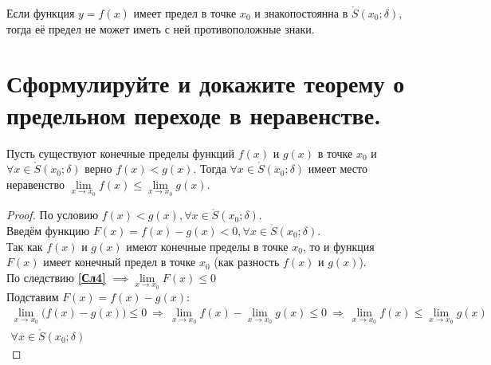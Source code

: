 \begin{corollary} 
  Если функция $y = f(x)$ имеет предел в точке  $x_0$ и знакопостоянна в $\mathring{S}(x_0; \delta)$, тогда её предел не может иметь с ней противоположные знаки.
\end{corollary} 

\section{Сформулируйте и докажите теорему о предельном переходе в неравенстве.}

\begin{theorem}
  Пусть существуют конечные пределы функций $f(x)$ и  $g(x)$ в точке $x_0$ и $\forall x \in \mathring{S}(x_0; \delta)$ верно $f(x) < g(x)$. Тогда $\forall x \in \mathring{S}(x_0; \delta)$ имеет место неравенство $\lim\limits_{x \to x_0} f(x) \le \lim\limits_{x \to x_0} g(x)$.
\end{theorem}
\begin{proof}
  По условию $f(x) < g(x), \forall x \in \mathring{S}(x_0; \delta)$. \\
  Введём функцию $F(x) = f(x) - g(x) < 0, \forall x \in \mathring{S}(x_0; \delta)$. \\
  Так как $f(x)$ и $g(x)$ имеют конечные пределы в точке $x_0$, то и функция $F(x)$ имеет конечный предел в точке $x_0$ (как разность $f(x)$ и $g(x)$).\\
  По следствию \textbf{\ref{Сл4}} $\implies \lim\limits_{x \to x_0} F(x) \le 0$ \\
  Подставим $F(x) = f(x) - g(x)$:
  \begin{gather*}
    \lim_{x \to x_0} \big( f(x) - g(x) \big) \le 0\ \Rightarrow\ \lim_{x \to x_0} f(x) - \lim_{x \to x_0} g(x) \le 0\ \Rightarrow\ \lim_{x \to x_0} f(x) \le \lim_{x \to x_0} g(x)\\
    \forall x \in \mathring{S}(x_0; \delta) 
  \end{gather*}
\end{proof}
\newpage
